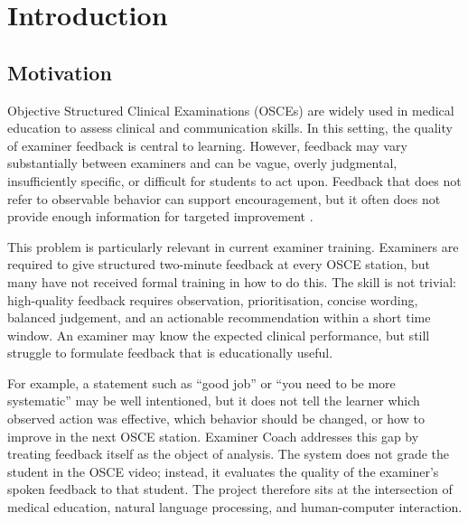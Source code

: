 \section{Introduction}

\subsection{Motivation}
Objective Structured Clinical Examinations (OSCEs) are widely used in medical
education to assess clinical and communication skills. In this setting, the
quality of examiner feedback is central to learning. However, feedback may vary
substantially between examiners and can be vague, overly judgmental,
insufficiently specific, or difficult for students to act upon. Feedback that
does not refer to observable behavior can support encouragement, but it often
does not provide enough information for targeted improvement
\cite{hattie2007power,gigante2011getting,ramani2012twelve}.

This problem is particularly relevant in current examiner training. Examiners
are required to give structured two-minute feedback at every OSCE station, but
many have not received formal training in how to do this. The skill is not
trivial: high-quality feedback requires observation, prioritisation, concise
wording, balanced judgement, and an actionable recommendation within a short
time window. An examiner may know the expected clinical performance, but still
struggle to formulate feedback that is educationally useful.

For example, a statement such as ``good job'' or ``you need to be more
systematic'' may be well intentioned, but it does not tell the learner which
observed action was effective, which behavior should be changed, or how to
improve in the next OSCE station. Examiner Coach addresses this gap by treating
feedback itself as the object of analysis. The system does not grade the
student in the OSCE video; instead, it evaluates the quality of the examiner's
spoken feedback to that student. The project therefore sits at the intersection
of medical education, natural language processing, and human-computer
interaction.

